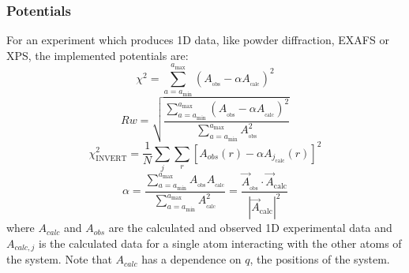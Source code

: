\subsubsection{Potentials}
For an experiment which produces 1D data, like powder diffraction, EXAFS or XPS, the implemented potentials are:
\begin{equation} \label{chi}
\chi^{2} = 
\sum_{a=a_\mathrm{min}}^{a_\mathrm{max}} \left(A_{_\mathrm{obs}} - \alpha A_{_\mathrm{calc}}\right)^{2}
\end{equation}
\begin{equation}\label{Rw}
Rw = 
\sqrt{\frac{\sum_{a=a_\mathrm{min}}^{a_\mathrm{max}} \left(A_{_\mathrm{obs}} - \alpha A_{_\mathrm{calc}}\right)^{2}}{\sum_{a=a_\mathrm{min}}^{a_\mathrm{max}} A_{_\mathrm{obs}}^{2}}}
\end{equation}
\begin{equation}\label{INVERT}
  \chi^{2}_{\mathrm{INVERT}} = \frac{1}{N}\sum_{j}\sum_{r}[A_{obs}(r) - \alpha A_{j_\mathrm{calc}}(r)]^{2}
\end{equation}
\begin{equation} \label{alpha}
\alpha  = \frac{\sum_{a=a_\mathrm{min}}^{a_\mathrm{max}}A_\mathrm{_\mathrm{obs}}A_{_\mathrm{calc}}}{\sum_{a=a_\mathrm{min}}^{a_\mathrm{max}} A_{_\mathrm{calc}}^{2}} = \frac{\vec{A}_{_\mathrm{obs}}\cdot\vec{A}_\mathrm{calc}}{|\vec{A}_\mathrm{calc}|^{2}}
\end{equation}
where $A_{calc}$ and $A_{obs}$ are the calculated and observed 1D experimental data
and $A_{calc, j}$ is the calculated data for a single atom interacting with the other atoms of the system. 
Note that $A_{calc}$ has a dependence on $q$, the positions of the system.

